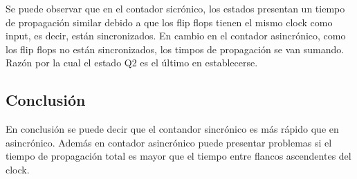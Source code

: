 Se puede observar que en el contador sicrónico, los estados presentan un tiempo de propagación similar debido a que los flip flops tienen el mismo clock como input, es decir, están sincronizados.
En cambio en el contador asincrónico, como los flip flops no están sincronizados, los timpos de propagación se van sumando. Razón por la cual el estado Q2 es el último en establecerse.

\subsection{Conclusión}
En conclusión se puede decir que el contandor sincrónico es más rápido que en asincrónico. Además en contador asincrónico puede presentar problemas si el tiempo de propagación total es mayor que el tiempo entre flancos ascendentes del clock.